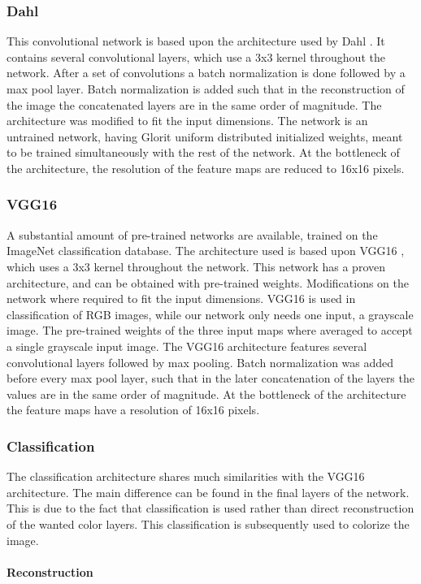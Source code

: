 \subsubsection{Dahl}%


This convolutional network is based upon the architecture used by Dahl \cite{Dahl}. It contains several convolutional layers, which use a 3x3 kernel throughout the network. After a set of convolutions a batch normalization is done followed by a max pool layer. Batch normalization is added such that in the reconstruction of the image the concatenated layers are in the same order of magnitude. The architecture was modified to fit the input dimensions. The network is an untrained network, having Glorit uniform distributed \cite{Glorot} initialized weights, meant to be trained simultaneously with the rest of the network. At the bottleneck of the architecture, the resolution of the feature maps are reduced to 16x16 pixels.
 

\subsubsection{VGG16}
A substantial amount of pre-trained networks are available, trained on the ImageNet classification database. The architecture used is based upon VGG16 \cite{Simonyan}, which uses a 3x3 kernel throughout the network. This network has a proven architecture, and can be obtained with pre-trained weights. Modifications on the network where required to fit the input dimensions. VGG16 is used in classification of RGB images, while our network only needs one input, a grayscale image. The pre-trained weights of the three input maps where averaged to accept a single grayscale input image. The VGG16 architecture features several convolutional layers followed by max pooling. Batch normalization was added before every max pool layer, such that in the later concatenation of the layers the values are in the same order of magnitude. At the bottleneck of the architecture the feature maps have a resolution of 16x16 pixels. 

\subsubsection{Classification}
The classification architecture shares much similarities with the VGG16 architecture. The main difference can be found in the final layers of the network. This is due to the fact that classification is used rather than direct reconstruction of the wanted color layers. This classification is subsequently used to colorize the image. \\
\\
\textbf{Reconstruction}

